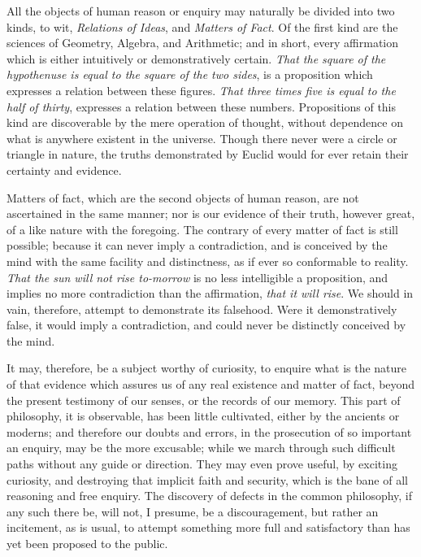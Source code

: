 \documentclass[]{article}
\begin{document}
\begin{sectionbody}

\humeparagraph  All the objects of human reason or enquiry may naturally be divided into two kinds, to wit, \emph{Relations of Ideas}, and \emph{Matters of Fact}. Of the first kind are the sciences of Geometry, Algebra, and Arithmetic; and in short, every affirmation which is either intuitively or demonstratively certain. \emph{That the square of the hypothenuse is equal to the square of the two sides}, is a proposition which expresses a relation between these figures. \emph{That three times five is equal to the half of thirty}, expresses a relation between these numbers. Propositions of this kind are discoverable by the mere operation of thought, without dependence on what is anywhere existent in the universe. Though there never were a circle or triangle in nature, the truths demonstrated by Euclid would for ever retain their certainty and evidence.

\humeparagraph  Matters of fact, which are the second objects of human reason, are not ascertained in the same manner; nor is our evidence of their truth, however great, of a like nature with the foregoing. The contrary of every matter of fact is still possible; because it can never imply a contradiction, and is conceived by the mind with the same facility and distinctness, as if ever so conformable to reality. \emph{That the sun will not rise to-morrow} is no less intelligible a proposition, and implies no more contradiction than the affirmation, \emph{that it will rise}. We should in vain, therefore, attempt to demonstrate its falsehood. Were it demonstratively false, it would imply a contradiction, and could never be distinctly conceived by the mind.

\humeparagraph  It may, therefore, be a subject worthy of curiosity, to enquire what is the nature of that evidence which assures us of any real existence and matter of fact, beyond the present testimony of our senses, or the records of our memory. This part of philosophy, it is observable, has been little cultivated, either by the ancients or moderns; and therefore our doubts and errors, in the prosecution of so important an enquiry, may be the more excusable; while we march through such difficult paths without any guide or direction. They may even prove useful, by exciting curiosity, and destroying that implicit faith and security, which is the bane of all reasoning and free enquiry. The discovery of defects in the common philosophy, if any such there be, will not, I presume, be a discouragement, but rather an incitement, as is usual, to attempt something more full and satisfactory than has yet been proposed to the public.


\end{sectionbody}
\end{document}
